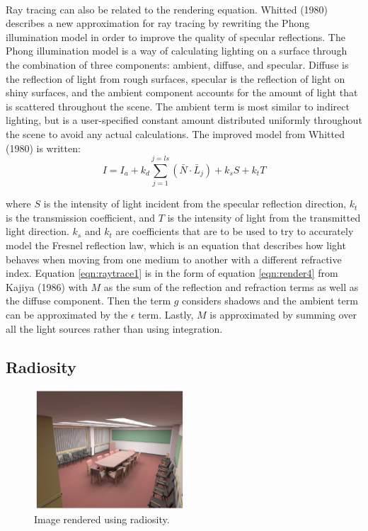 \paragraph{}
Ray tracing can also be related to the rendering equation.  Whitted (1980) describes a new approximation for ray tracing by rewriting the Phong illumination model in order to improve the quality of specular reflections.  The Phong illumination model is a way of calculating lighting on a surface through the combination of three components: ambient, diffuse, and specular.  Diffuse is the reflection of light from rough surfaces, specular is the reflection of light on shiny surfaces, and the ambient component accounts for the amount of light that is scattered throughout the scene.  The ambient term is most similar to indirect lighting, but is a user-specified constant amount distributed uniformly throughout the scene to avoid any actual calculations.  The improved model from Whitted (1980) is written:
\begin{equation}
I = I_{a} + k_{d}\sum_{j=1}^{j=ls}(\bar{N}\cdot\bar{L}_{j})+k_{s}S + k_{t}T \label{eqn:raytrace1}
\end{equation}

where $S$ is the intensity of light incident from the specular reflection direction, $k_{t}$ is the transmission coefficient, and $T$ is the intensity of light from the transmitted light direction. $k_{s}$ and $k_{t}$ are coefficients that are to be used to try to accurately model the Fresnel reflection law, which is an equation that describes how light behaves when moving from one medium to another with a different refractive index.  Equation \ref{eqn:raytrace1} is in the form of equation \ref{eqn:render4} from Kajiya (1986) with $M$ as the sum of the reflection and refraction terms as well as the diffuse component. Then the term $g$ considers shadows and the ambient term can be approximated by the $\epsilon$ term.  Lastly, $M$ is approximated by summing over all the light sources rather than using integration.

\subsection{Radiosity}

\begin{figure}[h!]
  \centering
    \includegraphics[width=0.5\textwidth]{radiositySample.jpg}
  \caption{Image rendered using radiosity.}
	\label{fig:radiositySample}
\end{figure}

